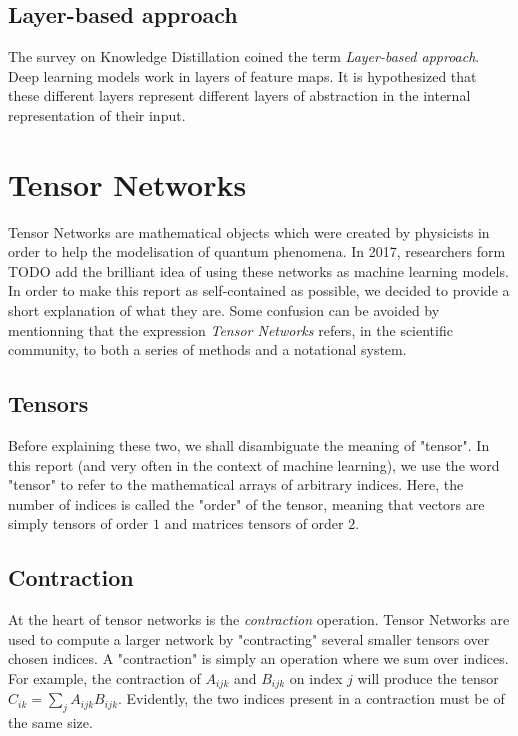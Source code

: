 \documentclass{article}
\theoremstyle{definition}
\theoremstyle{definition}
\begin{document}
\subsection{Layer-based approach}
The survey on Knowledge Distillation coined the term {\it Layer-based approach}.
Deep learning models work in layers of feature maps. It is hypothesized that
these different layers represent different layers of abstraction in the internal
representation of their input. 



\section{Tensor Networks}
Tensor Networks are mathematical objects which were created by physicists in order to help the modelisation of quantum phenomena.
In 2017, researchers form TODO add the brilliant idea of using these networks as machine learning models.
In order to make this report as self-contained as possible, we decided to provide a short explanation of what they are.
Some confusion can be avoided by mentionning that the expression \emph{Tensor Networks} refers, in the scientific community, to both a series of methods and a notational system.

\subsection{Tensors}
Before explaining these two, we shall disambiguate the meaning of "tensor". 
In this report (and very often in the context of machine learning), we use the word "tensor" to refer to the mathematical arrays of arbitrary indices. 
Here, the number of indices is called the "order" of the tensor, meaning that vectors are simply tensors of order $1$ and matrices tensors of order $2$. 

\subsection{Contraction}
At the heart of tensor networks is the {\it contraction} operation.
Tensor Networks are used to compute a larger network by "contracting" several
smaller tensors over chosen indices. A "contraction" is simply an operation 
where we sum over indices. For example, the contraction of $A_{ijk}$ and 
$B_{ijk}$ on index $j$ will produce the tensor $C_{ik} = \sum_{j} A_{ijk} B_{ijk}$.
Evidently, the two indices present in a contraction must be of the same size.
\end{document}
